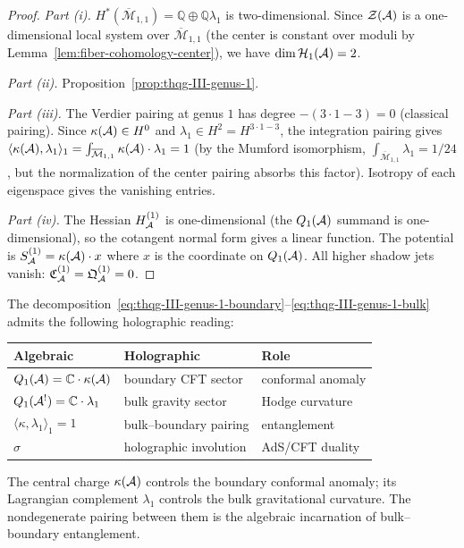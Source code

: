 \begin{proof}
\emph{Part (i).}
$H^*(\overline{\mathcal{M}}_{1,1}) = \mathbb{Q} \oplus
\mathbb{Q}\lambda_1$ is two-dimensional.
Since $\mathcal{Z}(\mathcal{A})$ is a one-dimensional local system
over $\overline{\mathcal{M}}_{1,1}$ (the center is constant
over moduli by
Lemma~\ref{lem:fiber-cohomology-center}), we have
$\dim \mathcal{H}_1(\mathcal{A}) = 2$.

\emph{Part (ii).}
Proposition~\ref{prop:thqg-III-genus-1}.

\emph{Part (iii).}
The Verdier pairing at genus $1$ has degree
$-(3 \cdot 1 - 3) = 0$ (classical pairing).
Since $\kappa(\mathcal{A}) \in H^0$ and
$\lambda_1 \in H^2 = H^{3 \cdot 1 - 3}$,
the integration pairing gives
$\langle \kappa(\mathcal{A}), \lambda_1 \rangle_1
= \int_{\overline{\mathcal{M}}_{1,1}} \kappa(\mathcal{A}) \cdot
\lambda_1 = 1$ (by the Mumford isomorphism,
$\int_{\overline{\mathcal{M}}_{1,1}} \lambda_1 = 1/24$,
but the normalization of the center pairing absorbs this
factor). Isotropy of each eigenspace gives the vanishing
entries.

\emph{Part (iv).}
The Hessian $H_{\mathcal{A}}^{(1)}$ is one-dimensional (the
$Q_1(\mathcal{A})$ summand is one-dimensional), so the cotangent
normal form gives a linear function. The potential is
$S_{\mathcal{A}}^{(1)} = \kappa(\mathcal{A}) \cdot x$ where $x$ is the
coordinate on $Q_1(\mathcal{A})$. All higher shadow jets vanish:
$\mathfrak{C}_{\mathcal{A}}^{(1)} = \mathfrak{Q}_{\mathcal{A}}^{(1)} = 0$.
\end{proof}

\begin{remark}
\label{rem:thqg-III-holographic-dictionary}
The decomposition~\eqref{eq:thqg-III-genus-1-boundary}--\eqref{eq:thqg-III-genus-1-bulk}
admits the following holographic reading:
\begin{center}
\renewcommand{\arraystretch}{1.2}
\begin{tabular}{l@{\quad}l@{\quad}l}
\textbf{Algebraic} & \textbf{Holographic} & \textbf{Role} \\
\midrule
$Q_1(\mathcal{A}) = \mathbb{C} \cdot \kappa(\mathcal{A})$ &
 boundary CFT sector &
 conformal anomaly \\
$Q_1(\mathcal{A}^!) = \mathbb{C} \cdot \lambda_1$ &
 bulk gravity sector &
 Hodge curvature \\
$\langle \kappa, \lambda_1 \rangle_1 = 1$ &
 bulk--boundary pairing &
 entanglement \\
$\sigma$ &
 holographic involution &
 AdS/CFT duality \\
\end{tabular}
\end{center}
The central charge $\kappa(\mathcal{A})$ controls the
boundary conformal anomaly; its Lagrangian complement
$\lambda_1$ controls the bulk gravitational curvature.
The nondegenerate pairing between them is the algebraic
incarnation of bulk--boundary entanglement.
\end{remark}

